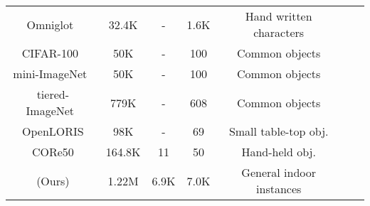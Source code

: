 \begin{table}[t]
\begin{center}
\begin{small}
\begin{tabular}{ccccccc}
    Omniglot~\citep{omniglot}      & 32.4K        & -           & 1.6K       & Hand written characters      \\
    CIFAR-100~\citep{cifar}        & 50K          & -           & 100        & Common objects               \\
    mini-ImageNet~\citep{matchingnet}& 50K        & -           & 100        & Common objects               \\
    tiered-ImageNet~\citep{fewshotssl}& 779K      & -           & 608        & Common objects               \\
    OpenLORIS  \citep{openloris}   & 98K          & -           & 69         & Small table-top obj.         \\
    CORe50  \citep{core50}         & 164.8K       & 11          & 50         & Hand-held obj.               \\
    \midrule                                                                                                          
    \ourroom{} (Ours)            & 1.22M         & 6.9K        & 7.0K       & General indoor instances     \\
    \bottomrule
    \end{tabular}
    \vspace{-0.2in}
    \end{small}
    \end{center}
\fi
\end{table}
